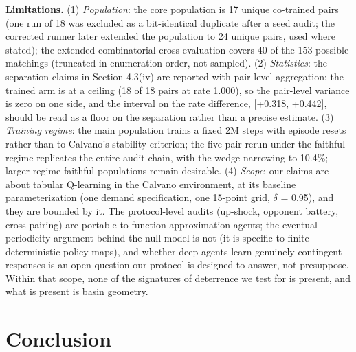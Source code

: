 \documentclass[sigconf]{acmart}
\begin{document}
\textbf{Limitations.} (1) \emph{Population}: the core population is 17
unique co-trained pairs (one run of 18 was excluded as a bit-identical
duplicate after a seed audit; the corrected runner later extended the
population to 24 unique pairs, used where stated); the extended
combinatorial cross-evaluation covers 40 of the 153 possible matchings
(truncated in enumeration order, not sampled). (2) \emph{Statistics}:
the separation claims in Section 4.3(iv) are reported with pair-level
aggregation; the trained arm is at a ceiling (18 of 18 pairs at rate
1.000), so the pair-level variance is zero on one side, and the interval
on the rate difference, {[}+0.318, +0.442{]}, should be read as a floor
on the separation rather than a precise estimate. (3) \emph{Training
regime}: the main population trains a fixed 2M steps with episode resets
rather than to Calvano's stability criterion; the five-pair rerun under
the faithful regime replicates the entire audit chain, with the wedge
narrowing to 10.4\%; larger regime-faithful populations remain
desirable. (4) \emph{Scope}: our claims are about tabular Q-learning in
the Calvano environment, at its baseline parameterization (one demand
specification, one 15-point grid, \ensuremath{\delta} = 0.95), and they
are bounded by it. The protocol-level audits (up-shock, opponent
battery, cross-pairing) are portable to function-approximation agents;
the eventual-periodicity argument behind the null model is not (it is
specific to finite deterministic policy maps), and whether deep agents
learn genuinely contingent responses is an open question our protocol is
designed to answer, not presuppose. Within that scope, none of the
signatures of deterrence we test for is present, and what is present is
basin geometry.

\section{Conclusion}\label{conclusion}
\end{document}

